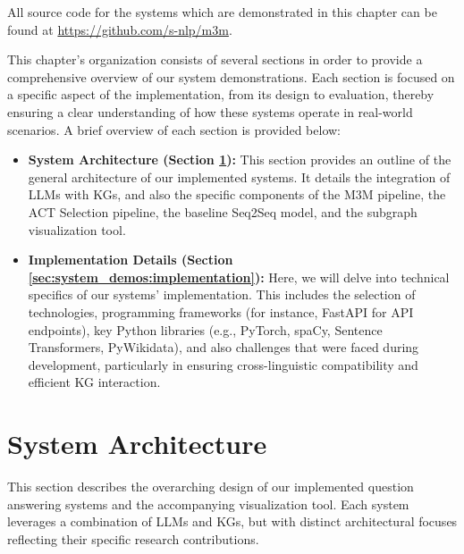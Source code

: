 All source code for the systems which are demonstrated in this chapter can be found at \url{https://github.com/s-nlp/m3m}.

This chapter's organization consists of several sections in order to provide a comprehensive overview of our system demonstrations. Each section is focused on a specific aspect of the implementation, from its design to evaluation, thereby ensuring a clear understanding of how these systems operate in real-world scenarios. A brief overview of each section is provided below:


\begin{itemize}
    \item \textbf{System Architecture (Section \ref{sec:system_demos:architecture}):} This section provides an outline of the general architecture of our implemented systems. It details the integration of LLMs with KGs, and also the specific components of the M3M pipeline, the ACT Selection pipeline, the baseline Seq2Seq model, and the subgraph visualization tool.
    \item \textbf{Implementation Details (Section \ref{sec:system_demos:implementation}):} Here, we will delve into technical specifics of our systems' implementation. This includes the selection of technologies, programming frameworks (for instance, FastAPI for API endpoints), key Python libraries (e.g., PyTorch, spaCy, Sentence Transformers, PyWikidata), and also challenges that were faced during development, particularly in ensuring cross-linguistic compatibility and efficient KG interaction.
\end{itemize}

\section{System Architecture}
\label{sec:system_demos:architecture}
This section describes the overarching design of our implemented question answering systems and the accompanying visualization tool. Each system leverages a combination of LLMs and KGs, but with distinct architectural focuses reflecting their specific research contributions.

